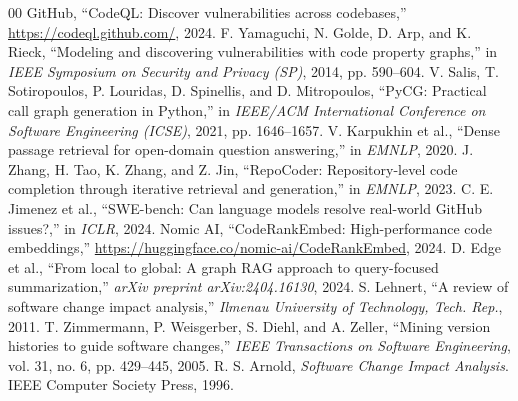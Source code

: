 \documentclass[conference]{IEEEtran}
\begin{document}
\begin{thebibliography}{00}
 GitHub, ``CodeQL: Discover vulnerabilities across codebases,'' \url{https://codeql.github.com/}, 2024.
 F. Yamaguchi, N. Golde, D. Arp, and K. Rieck, ``Modeling and discovering vulnerabilities with code property graphs,'' in \textit{IEEE Symposium on Security and Privacy (SP)}, 2014, pp. 590--604.
 V. Salis, T. Sotiropoulos, P. Louridas, D. Spinellis, and D. Mitropoulos, ``PyCG: Practical call graph generation in Python,'' in \textit{IEEE/ACM International Conference on Software Engineering (ICSE)}, 2021, pp. 1646--1657.
 V. Karpukhin et al., ``Dense passage retrieval for open-domain question answering,'' in \textit{EMNLP}, 2020.
 J. Zhang, H. Tao, K. Zhang, and Z. Jin, ``RepoCoder: Repository-level code completion through iterative retrieval and generation,'' in \textit{EMNLP}, 2023.
 C. E. Jimenez et al., ``SWE-bench: Can language models resolve real-world GitHub issues?,'' in \textit{ICLR}, 2024.
 Nomic AI, ``CodeRankEmbed: High-performance code embeddings,'' \url{https://huggingface.co/nomic-ai/CodeRankEmbed}, 2024.
 D. Edge et al., ``From local to global: A graph RAG approach to query-focused summarization,'' \textit{arXiv preprint arXiv:2404.16130}, 2024.
 S. Lehnert, ``A review of software change impact analysis,'' \textit{Ilmenau University of Technology, Tech. Rep.}, 2011.
 T. Zimmermann, P. Weisgerber, S. Diehl, and A. Zeller, ``Mining version histories to guide software changes,'' \textit{IEEE Transactions on Software Engineering}, vol. 31, no. 6, pp. 429--445, 2005.
 R. S. Arnold, \textit{Software Change Impact Analysis}. IEEE Computer Society Press, 1996.
\end{thebibliography}
\end{document}

